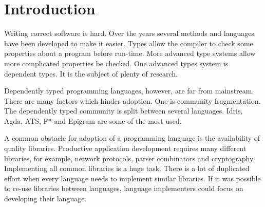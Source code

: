 \chapter{Introduction}




Writing correct software is hard. Over the years several methods and languages
have been developed to make it easier. Types allow the compiler to check some
properties about a program before run-time. More advanced type systems allow
more complicated properties be checked.
One advanced types system is dependent types. It is the subject of plenty
of research.

Dependently typed programming languages, however, are far from mainstream.
There are many factors which hinder adoption. One is community fragmentation.
The dependently typed community  is split between several languages.
Idris, Agda, ATS, F* and Epigram are some of the most used.

A common obstacle for adoption of a programming language is the
availability of quality libraries. Productive application development requires
many different libraries, for example, network protocols, parser combinators
and cryptography.
Implementing all common libraries is a huge task.  There is
a lot of duplicated effort when every language needs to implement similar
libraries.  If it was possible to re-use libraries between languages,
language implementers could focus on developing their language.

